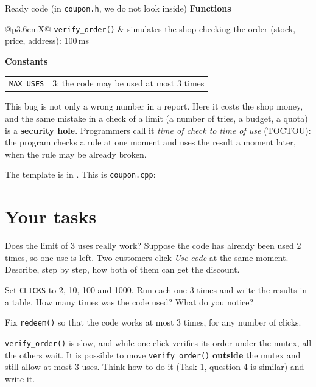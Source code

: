 \begin{note}{Ready code (in \texttt{coupon.h}, we do not look inside)}
\textbf{Functions}\\[2pt]
\begin{tabularx}{\linewidth}{@{}p{3.6cm}X@{}}
\texttt{verify\_order()} & simulates the shop checking the order (stock, price, address): 100\,ms \\
\end{tabularx}
\par\smallskip\textbf{Constants}\\[2pt]
\begin{tabularx}{\linewidth}{@{}p{3.6cm}X@{}}
\texttt{MAX\_USES} & 3: the code may be used at most 3 times \\
\end{tabularx}
\end{note}

This bug is not only a wrong number in a report. Here it costs the shop money, and the same mistake in a
check of a limit (a number of tries, a budget, a quota) is a \textbf{security hole}. Programmers call it
\emph{time of check to time of use} (TOCTOU): the program checks a rule at one moment and uses the result
a moment later, when the rule may be already broken.

\codesection

The template is in . This is \texttt{coupon.cpp}:


\runline

\section{Your tasks}

\begin{questions}
  \item Does the limit of 3 uses really work? Suppose the code has already been used 2 times, so one use is left.
        Two customers click \emph{Use code} at the same moment. Describe, step by step, how both of them can get
        the discount.
  \item Set \texttt{CLICKS} to 2, 10, 100 and 1000. Run each one 3 times and write the results in a table.
        How many times was the code used? What do you notice?
  \item Fix \texttt{redeem()} so that the code works at most 3 times, for any number of clicks.
  \item \texttt{verify\_order()} is slow, and while one click verifies its order under the mutex, all the others
        wait. It is possible to move \texttt{verify\_order()} \textbf{outside} the mutex and still allow at most
        3 uses. Think how to do it (Task 1, question 4 is similar) and write it.
\end{questions}
